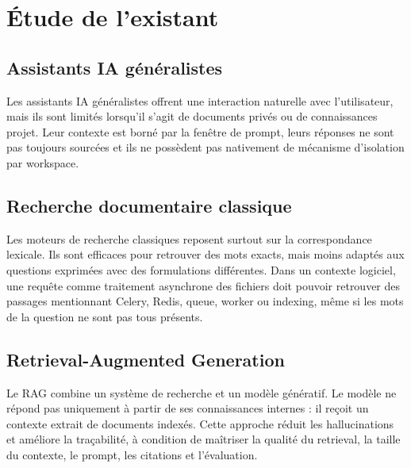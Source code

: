 \documentclass[12pt,a4paper,oneside]{report}
\begin{document}
\chapter{Étude de l'existant}

\section{Assistants IA généralistes}
Les assistants IA généralistes offrent une interaction naturelle avec l'utilisateur, mais ils sont limités lorsqu'il s'agit de documents privés ou de connaissances projet. Leur contexte est borné par la fenêtre de prompt, leurs réponses ne sont pas toujours sourcées et ils ne possèdent pas nativement de mécanisme d'isolation par workspace.

\section{Recherche documentaire classique}
Les moteurs de recherche classiques reposent surtout sur la correspondance lexicale. Ils sont efficaces pour retrouver des mots exacts, mais moins adaptés aux questions exprimées avec des formulations différentes. Dans un contexte logiciel, une requête comme \og traitement asynchrone des fichiers \fg{} doit pouvoir retrouver des passages mentionnant Celery, Redis, queue, worker ou indexing, même si les mots de la question ne sont pas tous présents.

\section{Retrieval-Augmented Generation}
Le RAG combine un système de recherche et un modèle génératif. Le modèle ne répond pas uniquement à partir de ses connaissances internes : il reçoit un contexte extrait de documents indexés. Cette approche réduit les hallucinations et améliore la traçabilité, à condition de maîtriser la qualité du retrieval, la taille du contexte, le prompt, les citations et l'évaluation.
\end{document}
